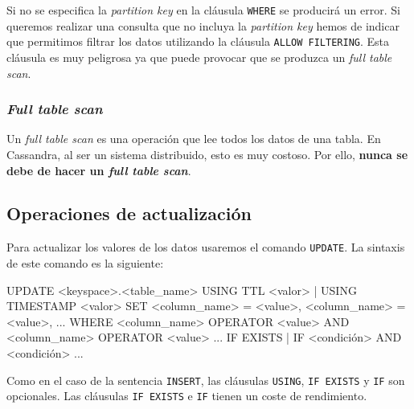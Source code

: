 \documentclass[
]{book}
\newenvironment{Shaded}{}{}
\newcommand{\NormalTok}[1]{#1}
\begin{document}
Si no se especifica la \emph{partition key} en la cláusula \texttt{WHERE} se producirá un error. Si queremos realizar una consulta que no incluya la \emph{partition key} hemos de indicar que permitimos filtrar los datos utilizando la cláusula \texttt{ALLOW\ FILTERING}. Esta cláusula es muy peligrosa ya que puede provocar que se produzca un \emph{full table scan}.

\subsubsection{\texorpdfstring{\emph{Full table scan}}{Full table scan}}\label{full-table-scan}

Un \emph{full table scan} es una operación que lee todos los datos de una tabla. En Cassandra, al ser un sistema distribuido, esto es muy costoso. Por ello, \textbf{nunca se debe de hacer un \emph{full table scan}}.

\subsection{Operaciones de actualización}\label{operaciones-de-actualizaciuxf3n}

Para actualizar los valores de los datos usaremos el comando \texttt{UPDATE}. La sintaxis de este comando es la siguiente:

\begin{Shaded}
\begin{Highlighting}[]
\NormalTok{UPDATE \textless{}keyspace\textgreater{}.\textless{}table\_name\textgreater{}}
\NormalTok{USING TTL \textless{}valor\textgreater{} | USING TIMESTAMP \textless{}valor\textgreater{} }
\NormalTok{SET \textless{}column\_name\textgreater{} = \textless{}value\textgreater{}, \textless{}column\_name\textgreater{} = \textless{}value\textgreater{}, ...}
\NormalTok{WHERE \textless{}column\_name\textgreater{} OPERATOR \textless{}value\textgreater{}}
\NormalTok{  AND \textless{}column\_name\textgreater{} OPERATOR \textless{}value\textgreater{}}
\NormalTok{  ...}
\NormalTok{IF EXISTS | IF \textless{}condición\textgreater{}}
\NormalTok{  AND \textless{}condición\textgreater{}}
\NormalTok{  ...}
\end{Highlighting}
\end{Shaded}

Como en el caso de la sentencia \texttt{INSERT}, las cláusulas \texttt{USING}, \texttt{IF\ EXISTS} y \texttt{IF} son opcionales. Las cláusulas \texttt{IF\ EXISTS} e \texttt{IF} tienen un coste de rendimiento.
\end{document}
